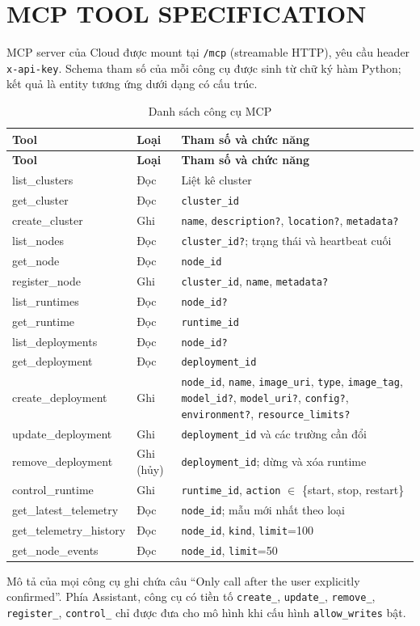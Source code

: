 \chapter{MCP TOOL SPECIFICATION}

MCP server của Cloud được mount tại \texttt{/mcp} (streamable HTTP), yêu cầu
header \texttt{x-api-key}. Schema tham số của mỗi công cụ được sinh từ chữ ký hàm
Python; kết quả là entity tương ứng dưới dạng có cấu trúc.

\begin{longtable}{L{4.3cm}L{2.2cm}L{8cm}}
\caption{Danh sách công cụ MCP}\label{tab:mcp-tools}\\
\toprule
\textbf{Tool} & \textbf{Loại} & \textbf{Tham số và chức năng}\\
\midrule\endfirsthead
\toprule
\textbf{Tool} & \textbf{Loại} & \textbf{Tham số và chức năng}\\
\midrule\endhead
list\_clusters & Đọc & Liệt kê cluster\\
get\_cluster & Đọc & \texttt{cluster\_id}\\
create\_cluster & Ghi & \texttt{name}, \texttt{description?}, \texttt{location?}, \texttt{metadata?}\\
list\_nodes & Đọc & \texttt{cluster\_id?}; trạng thái và heartbeat cuối\\
get\_node & Đọc & \texttt{node\_id}\\
register\_node & Ghi & \texttt{cluster\_id}, \texttt{name}, \texttt{metadata?}\\
list\_runtimes & Đọc & \texttt{node\_id?}\\
get\_runtime & Đọc & \texttt{runtime\_id}\\
list\_deployments & Đọc & \texttt{node\_id?}\\
get\_deployment & Đọc & \texttt{deployment\_id}\\
create\_deployment & Ghi & \texttt{node\_id}, \texttt{name}, \texttt{image\_uri}, \texttt{type}, \texttt{image\_tag}, \texttt{model\_id?}, \texttt{model\_uri?}, \texttt{config?}, \texttt{environment?}, \texttt{resource\_limits?}\\
update\_deployment & Ghi & \texttt{deployment\_id} và các trường cần đổi\\
remove\_deployment & Ghi (hủy) & \texttt{deployment\_id}; dừng và xóa runtime\\
control\_runtime & Ghi & \texttt{runtime\_id}, \texttt{action} $\in$ \{start, stop, restart\}\\
get\_latest\_telemetry & Đọc & \texttt{node\_id}; mẫu mới nhất theo loại\\
get\_telemetry\_history & Đọc & \texttt{node\_id}, \texttt{kind}, \texttt{limit}=100\\
get\_node\_events & Đọc & \texttt{node\_id}, \texttt{limit}=50\\
\bottomrule
\end{longtable}

Mô tả của mọi công cụ ghi chứa câu ``Only call after the user explicitly
confirmed''. Phía Assistant, công cụ có tiền tố \texttt{create\_},
\texttt{update\_}, \texttt{remove\_}, \texttt{register\_}, \texttt{control\_} chỉ
được đưa cho mô hình khi cấu hình \texttt{allow\_writes} bật.
